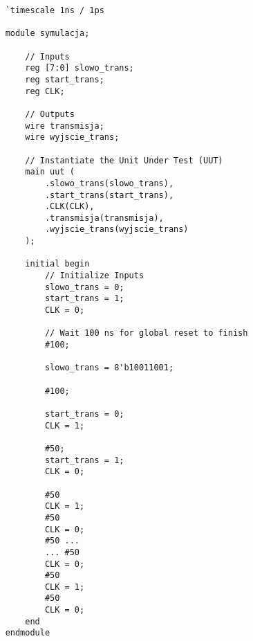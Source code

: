 \begin{lstlisting}
    `timescale 1ns / 1ps

    module symulacja;
    
        // Inputs
        reg [7:0] slowo_trans;
        reg start_trans;
        reg CLK;
    
        // Outputs
        wire transmisja;
        wire wyjscie_trans;
    
        // Instantiate the Unit Under Test (UUT)
        main uut (
            .slowo_trans(slowo_trans), 
            .start_trans(start_trans), 
            .CLK(CLK), 
            .transmisja(transmisja), 
            .wyjscie_trans(wyjscie_trans)
        );
    
        initial begin
            // Initialize Inputs
            slowo_trans = 0;
            start_trans = 1;
            CLK = 0;
    
            // Wait 100 ns for global reset to finish
            #100;
           
            slowo_trans = 8'b10011001;
             
            #100;
            
            start_trans = 0;
            CLK = 1;
            
            #50;
            start_trans = 1;
            CLK = 0;
            
            #50
            CLK = 1;
            #50
            CLK = 0;
            #50 ...
            ... #50
            CLK = 0;
            #50
            CLK = 1;
            #50
            CLK = 0;
        end
    endmodule    
\end{lstlisting}
